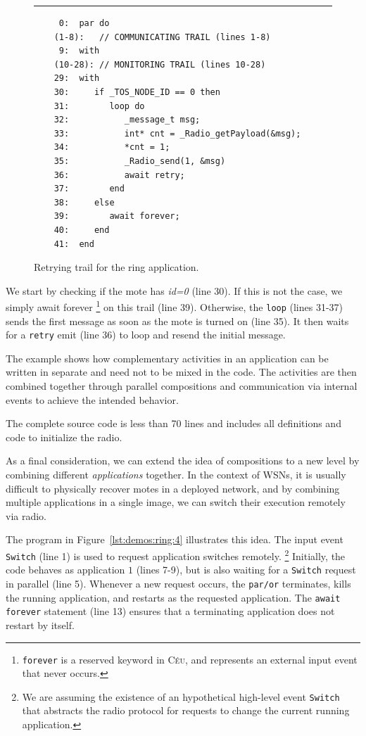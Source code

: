 \documentclass[11pt,a4paper]{article}
\newcommand{\2}{\;\;}
\newcommand{\5}{\;\;\;\;\;}
\newcommand{\CEU}{\textsc{C\'{e}u}}
\newcommand{\code}[1] {{\small{\texttt{#1}}}}
\begin{document}
\begin{figure}[h!]
\rule{15cm}{0.37pt}
{\small
\begin{verbatim}
     0:  par do
    (1-8):   // COMMUNICATING TRAIL (lines 1-8)
     9:  with
    (10-28): // MONITORING TRAIL (lines 10-28)
    29:  with
    30:     if _TOS_NODE_ID == 0 then
    31:        loop do
    32:           _message_t msg;
    33:           int* cnt = _Radio_getPayload(&msg);
    34:           *cnt = 1;
    35:           _Radio_send(1, &msg)
    36:           await retry;
    37:        end
    38:     else
    39:        await forever;
    40:     end
    41:  end
\end{verbatim}
}
\caption{ Retrying trail for the ring application.
\label{lst:demos:ring:3}
}
\end{figure}

We start by checking if the mote has \emph{id=0} (line 30).
If this is not the case, we simply await forever%
\footnote{\code{forever} is a reserved keyword in \CEU, and represents an 
external input event that never occurs.}
on this trail (line 39).
Otherwise, the \code{loop} (lines 31-37) sends the first message as soon as the 
mote is turned on (line 35).
It then waits for a \code{retry} emit (line 36) to loop and resend the initial 
message.

The example shows how complementary activities in an application can be written 
in separate and need not to be mixed in the code.
The activities are then combined together through parallel compositions and 
communication via internal events to achieve the intended behavior.

The complete source code is less than 70 lines and includes all definitions and 
code to initialize the radio.

As a final consideration, we can extend the idea of compositions to a new level 
by combining different \emph{applications} together.
In the context of WSNs, it is usually difficult to physically recover motes in 
a deployed network, and by combining multiple applications in a single image, 
we can switch their execution remotely via radio.

The program in Figure~\ref{lst:demos:ring:4} illustrates this idea.
The input event \code{Switch} (line 1) is used to request application switches 
remotely.%
\footnote{ We are assuming the existence of an hypothetical high-level event 
\code{Switch} that abstracts the radio protocol for requests to change the 
current running application. }
Initially, the code behaves as application $1$ (lines 7-9), but is also waiting 
for a \code{Switch} request in parallel (line 5).
Whenever a new request occurs, the \code{par/or} terminates, kills the running 
application, and restarts as the requested application.
The \code{await forever} statement (line 13) ensures that a terminating 
application does not restart by itself.
\end{document}
